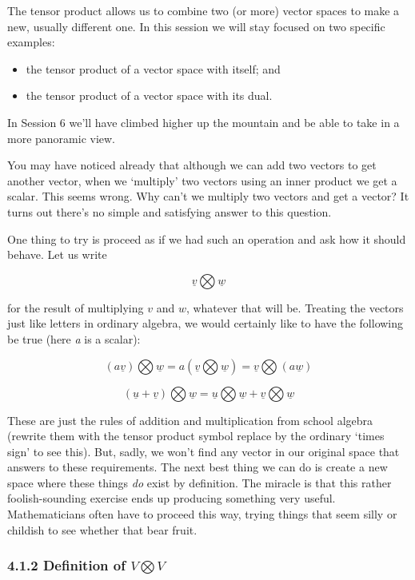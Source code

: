 \documentclass[oneside,english]{amsbook}
\numberwithin{section}{chapter}
\theoremstyle{plain}
\theoremstyle{definition}
\begin{document}
The tensor product allows us to combine two (or more) vector spaces to
make a new, usually different one. In this session we will stay focused
on two specific examples:

\begin{itemize}
	\item
	the tensor product of a vector space with itself; and
	\item
	the tensor product of a vector space with its dual.
\end{itemize}

In Session 6 we'll have climbed higher up the mountain and be able to
take in a more panoramic view.

You may have noticed already that although we can add two vectors to get
another vector, when we `multiply' two vectors using an inner product
we get a scalar. This seems wrong. Why can't we multiply two vectors and
get a vector? It turns out there's no simple and satisfying answer to
this question.

One thing to try is proceed as if we had such an operation and ask how
it should behave. Let us write

\[\underline{v}\bigotimes\underline{w}\]

for the result of multiplying $v$ and $w$, whatever that will be.
Treating the vectors just like letters in ordinary algebra, we would
certainly like to have the following be true (here \emph{a} is a
scalar):

\[\left( a\underline{v} \right)\bigotimes\underline{w} = a\left( \underline{v}\bigotimes\underline{w} \right) = \underline{v}\bigotimes(a\underline{w})\]

\[\left( \underline{u} + \underline{v} \right)\bigotimes\underline{w} = \underline{u}\bigotimes\underline{w} + \underline{v}\bigotimes\underline{w}\]

These are just the rules of addition and multiplication from school
algebra (rewrite them with the tensor product symbol replace by the
ordinary `times sign' to see this). But, sadly, we won't find any
vector in our original space that answers to these requirements. The
next best thing we can do is create a new space where these things
\emph{do} exist by definition. The miracle is that this rather
foolish-sounding exercise ends up producing something very useful.
Mathematicians often have to proceed this way, trying things that seem
silly or childish to see whether that bear fruit.

\subsubsection{\texorpdfstring{4.1.2 Definition of
		\(V\bigotimes V\)}{4.1.2 Definition of V\textbackslash bigotimes V}}\label{definition-of-vbigotimes-v}
\end{document}
